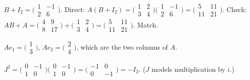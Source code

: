 \begin{solutions}
    \item $B + I_{2} = \bigl(\begin{smallmatrix} 1 & -1 \\ 2 & 6 \end{smallmatrix}\bigr)$. Direct: $A(B + I_{2}) = \bigl(\begin{smallmatrix} 1 & 2 \\ 3 & 4 \end{smallmatrix}\bigr)\bigl(\begin{smallmatrix} 1 & -1 \\ 2 & 6 \end{smallmatrix}\bigr) = \bigl(\begin{smallmatrix} 5 & 11 \\ 11 & 21 \end{smallmatrix}\bigr)$. Check: $A B + A = \bigl(\begin{smallmatrix} 4 & 9 \\ 8 & 17 \end{smallmatrix}\bigr) + \bigl(\begin{smallmatrix} 1 & 2 \\ 3 & 4 \end{smallmatrix}\bigr) = \bigl(\begin{smallmatrix} 5 & 11 \\ 11 & 21 \end{smallmatrix}\bigr)$. Match.

    \item $A e_{1} = \bigl(\begin{smallmatrix} 1 \\ 3 \end{smallmatrix}\bigr)$, $A e_{2} = \bigl(\begin{smallmatrix} 2 \\ 4 \end{smallmatrix}\bigr)$, which are the two columns of $A$.

    \item $J^{2} = \bigl(\begin{smallmatrix} 0 & -1 \\ 1 & 0 \end{smallmatrix}\bigr)\bigl(\begin{smallmatrix} 0 & -1 \\ 1 & 0 \end{smallmatrix}\bigr) = \bigl(\begin{smallmatrix} -1 & 0 \\ 0 & -1 \end{smallmatrix}\bigr) = -I_{2}$. ($J$ models multiplication by $i$.)


\end{solutions}
